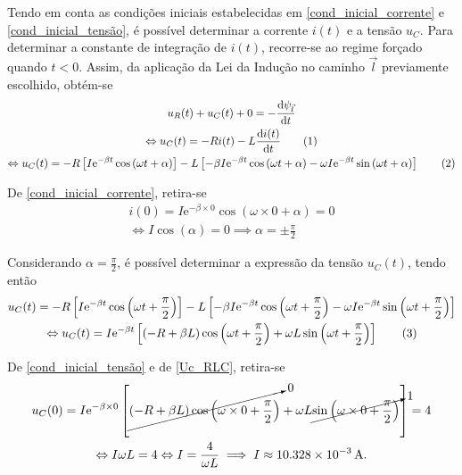 \documentclass[a4paper, titlepage, portuguese]{article}
\newcommand{\eq}{\Leftrightarrow} %
\newcommand\numberthis{\addtocounter{equation}{1}\tag{\theequation}}
\newcommand\e{\mathrm{e} }
\begin{document}
		Tendo em conta as condições iniciais estabelecidas em \eqref{cond_inicial_corrente} e \eqref{cond_inicial_tensão}, é possível determinar a corrente $i(t)$ e a tensão $u_{C}$. Para determinar a constante de integração de $i(t)$, recorre-se ao regime forçado quando $t < 0$. Assim, da aplicação da Lei da Indução no caminho $\vec{l}$ previamente escolhido, obtém-se
		\begin{gather*}
			u_R(t) + u_C(t) + 0 = - \dv{\psi_{\vec{l}}}{t} \\ \eq
			u_C(t) = -Ri(t) - L\dv{i(t)}{t} \numberthis \label{eq_Uc_lei_ind} \\ \eq
			u_C(t) = -R \left[ I\e^{-\beta t} \cos{(\omega t + \alpha)} \right] - L \left[ -\beta I\e^{-\beta t} \cos{(\omega t + \alpha)} - \omega I\e^{-\beta t} \sin{(\omega t + \alpha)}\right] \numberthis \label{eq_Uc_RLC}
		\end{gather*}

		De \eqref{cond_inicial_corrente}, retira-se
		\begin{gather*}
			 i(0) = I\e^{-\beta \times 0} \cos{(\omega \times 0 + \alpha)} = 0 \\ \eq
			 I\cos{(\alpha)} = 0 \implies \alpha = \pm \frac{\pi}{2}
		\end{gather*}

		Considerando $\alpha =  \frac{\pi}{2}$, é possível determinar a expressão da tensão $u_{C}(t)$, tendo então
		\begin{gather*}
			u_C(t) = -R \left[ I\e^{-\beta t} \cos{\left(\omega t + \frac{\pi}{2}\right)} \right] - L \left[ -\beta I\e^{-\beta t} \cos{\left(\omega t + \frac{\pi}{2}\right)} - \omega I\e^{-\beta t} \sin{\left(\omega t + \frac{\pi}{2}\right)}\right] \\ \eq
			u_C(t) = I\e^{-\beta t} \left[ \left( -R +\beta L\right) \cos{\left(\omega t + \frac{\pi}{2}\right)}  + \omega L\sin{\left(\omega t + \frac{\pi}{2}\right)} \right] \numberthis \label{Uc_RLC}
			\end{gather*}

		De \eqref{cond_inicial_tensão} e de \eqref{Uc_RLC}, retira-se
		\begin{gather*}
			u_{C}(0) = I\e^{-\beta \times 0} \left[ \cancelto{0}{\left( -R +\beta L\right) \cos{\left(\omega \times 0 + \frac{\pi}{2}\right)}}  + \omega L \cancelto{1}{\sin{\left(\omega \times 0 + \frac{\pi}{2}\right)}} \right] = 4 \\ \eq
			 I\omega L = 4 \eq I = \frac{4}{\omega L} \implies I \approx \SI{10.328e-3}{\ampere}.
		\end{gather*}
\end{document}

